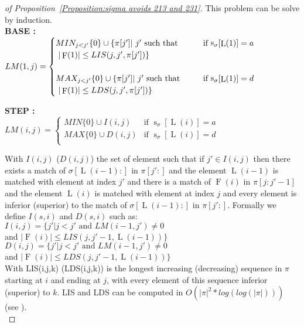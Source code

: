 \documentclass[a4paper]{llncs}
\newcommand{\ptext}{\pi}
\newcommand{\pmotif}{\sigma}
\DeclareMathOperator{\stripea}{s}
\newcommand{\stripe}[2]{\stripea_{{#1}}[{#2}]}
\newcounter{num}
\newcommand{\dstep}{d}
\newcommand{\ustep}{a}
\DeclareMathOperator{\firsta}{L}
\newcommand{\first}[1]{\firsta({#1})}
\DeclareMathOperator{\factora}{F}
\newcommand{\factor}[1]{\factora({#1})}
\begin{document}
\begin{proof}[of Proposition~\ref{Proposition:sigma avoids 213 and 231}]
This problem can be solve by induction.\\



\textbf{BASE :} \\
$
LM(1,j)=
\begin{cases}
		MIN_{j<j'}\{0\} \cup \{\ptext[j'] |\text{ $j'$ such that \indent } &
			\text{if $\stripe{\pmotif}{\first{1}}=\ustep$} \\
		\text{ $|\factor{1}| \leq LIS(j,j',\ptext[j'])  $}\}& \\
		&\\
		MAX_{j<j'}\{0\} \cup \{\ptext[j'] |\text{ $j'$ such that \indent } &
			\text{if $\stripe{\pmotif}{\first{1}}=\dstep$} \\
		\text{ $|\factor{1}| \leq LDS(j,j',\ptext[j']) $}\}&\\
\end{cases}
$

\textbf{STEP :} \\
$
LM(i,j)=
\begin{cases}
	MIN \{0\} \cup  I(i,j) &
	\text{if $\stripe{\pmotif}{\first{i}}=\ustep$}\\
	MAX \{0\} \cup  D(i,j) &
	\text{if $\stripe{\pmotif}{\first{i}}=\dstep$}\\
\end{cases}
$


With $I(i,j)$ ($D(i,j)$) the set of element such that
if  $j' \in I(i,j)$ then there exists
a match of $\pmotif[\first{i-1}:]$ in $\ptext[j':]$ and
the element $\first{i-1}$ is matched with element at index $j'$ and
there is a match of $\factor{i}$ in $\ptext[j:j'-1]$ and
the element $\first{i}$ is matched with element at index $j$ and every element is inferior (superior) to the match of
$\pmotif[\first{i-1}:]$ in $\ptext[j':]$.
Formally we define $I(s,i)$ and $D(s,i)$ such as:\\

$I(i,j)=\{j'|\text{$j<j'$ and $LM(i-1,j')\neq 0$}$ \\
\indent \indent \indent and  $|\factor{i}| \leq LIS(j,j'-1,\first{i-1})\}$ \\

$D(i,j)=\{j'|\text{$j<j'$ and $LM(i-1,j')\neq 0$}$ \\
\indent \indent \indent and  $|\factor{i}| \leq LDS(j,j'-1,\first{i-1}) \}$ \\

With LIS(i,j,k) (LDS(i,j,k)) is the longest increasing (decreasing) sequence in $\ptext$ starting at $i$ and ending at $j$,
with every element of this sequence
inferior (superior) to $k$.
LIS and LDS can be computed in $O(|\ptext|^2*log(log(|\ptext|)))$ (see \cite{Bespamyatnikh00enumeratinglongest}).\\


\end{proof}
\end{document}
